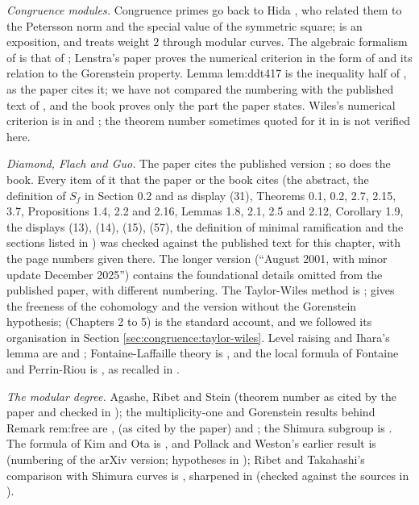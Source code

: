 \emph{Congruence modules.} Congruence primes go back to Hida \cite{Hida81}, who related them to the Petersson norm and the special value of the symmetric square; \cite{HidaBook} is an
exposition, and \cite{Ribet83} treats weight $2$ through modular curves. The algebraic formalism of  is that of \cite[Section 4]{DDT}; Lenstra's
paper \cite{Lenstra95} proves the numerical criterion in the form of  and its relation to the Gorenstein property. Lemma lem:ddt417 is the inequality half of
\cite[Lemma 4.17]{DDT}, as the paper cites it; we have not compared the numbering with the published text of \cite{DDT}, and the book proves only the part the paper states. Wiles's
numerical criterion is in \cite[Appendix]{Wiles95} and \cite[Section 5]{DDT}; the theorem number sometimes quoted for it in \cite{DDT} is not verified here.

\emph{Diamond, Flach and Guo.} The paper cites the published version \cite{DFG04}; so does the book. Every item of it that the paper or the book cites (the abstract, the definition of $S_f$ in
Section 0.2 and as display (31), Theorems 0.1, 0.2, 2.7, 2.15, 3.7, Propositions 1.4, 2.2 and 2.16, Lemmas 1.8, 2.1, 2.5 and 2.12, Corollary 1.9, the displays (13), (14), (15), (57), the definition
of minimal ramification and the sections listed in ) was checked against the published text for this chapter, with the page numbers given there. The longer version \cite{DFG04long} (``August 2001, with minor update December
2025'') contains the foundational details omitted from the published paper, with different numbering. The Taylor-Wiles method is \cite{Wiles95,TaylorWiles}; \cite{Diamond96} gives the freeness
of the cohomology and the version without the Gorenstein hypothesis; \cite{DDT} (Chapters 2 to 5) is the standard account, and we followed its organisation in
Section \ref{sec:congruence:taylor-wiles}. Level raising and Ihara's lemma are \cite{Ribet84,Ribet90} and \cite{DiamondTaylor94}; Fontaine-Laffaille theory is \cite{FontaineLaffaille}, and the
local formula of Fontaine and Perrin-Riou is \cite[I.4.2.2]{FPR94}, as recalled in \cite{DFG04}.

\emph{The modular degree.} Agashe, Ribet and Stein \cite[Theorem 2.2]{ARS12} (theorem number as cited by the paper and checked in ); the multiplicity-one and Gorenstein results
behind Remark rem:free are \cite{Mazur77}, \cite[Theorem 3.5]{RibetStein} (as cited by the paper) and \cite{Tilouine97}; the Shimura subgroup is \cite{LingOesterle,Ribet88}. The formula of Kim and Ota
is \cite[Theorem 1.1]{KimOta}, and Pollack and Weston's earlier result is \cite[Theorem 6.11]{PollackWeston11} (numbering of the arXiv version; hypotheses in ); Ribet and Takahashi's comparison with Shimura curves is \cite[Theorems 1 and 2]{RibetTakahashi97}, sharpened in \cite[Theorem 3.2, Corollary 3.5]{Takahashi01}
(checked against the sources in ).

